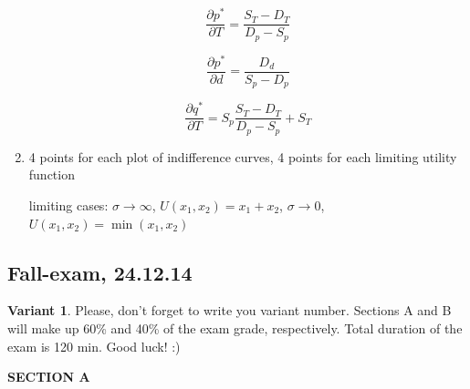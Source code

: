 \documentclass[12pt]{article} %
\theoremstyle{definition} %
\begin{document}
\begin{enumerate}
\[
\frac{\partial p^*}{\partial T}=\frac{S_T-D_T}{D_p-S_p}
\]

\[
\frac{\partial p^*}{\partial d}=\frac{D_d}{S_p-D_p}
\]

\[
\frac{\partial q^*}{\partial T}=S_p\frac{S_T-D_T}{D_p-S_p}+S_T
\]

\item 4 points for each plot of indifference curves, 4 points for each limiting utility function

limiting cases: $\sigma\to\infty$, $U(x_1,x_2)=x_1+x_2$, $\sigma\to 0$, $U(x_1,x_2)=\min(x_1,x_2)$


\end{enumerate}



\subsection{Fall-exam, 24.12.14}

\textbf{Variant 1}. Please, don't forget to write you variant number. Sections A and B will make up 60\% and 40\% of the exam grade, respectively. Total duration of the exam is 120 min. Good luck! :)

\vspace{10pt}

\textbf{SECTION A}
\end{document}
